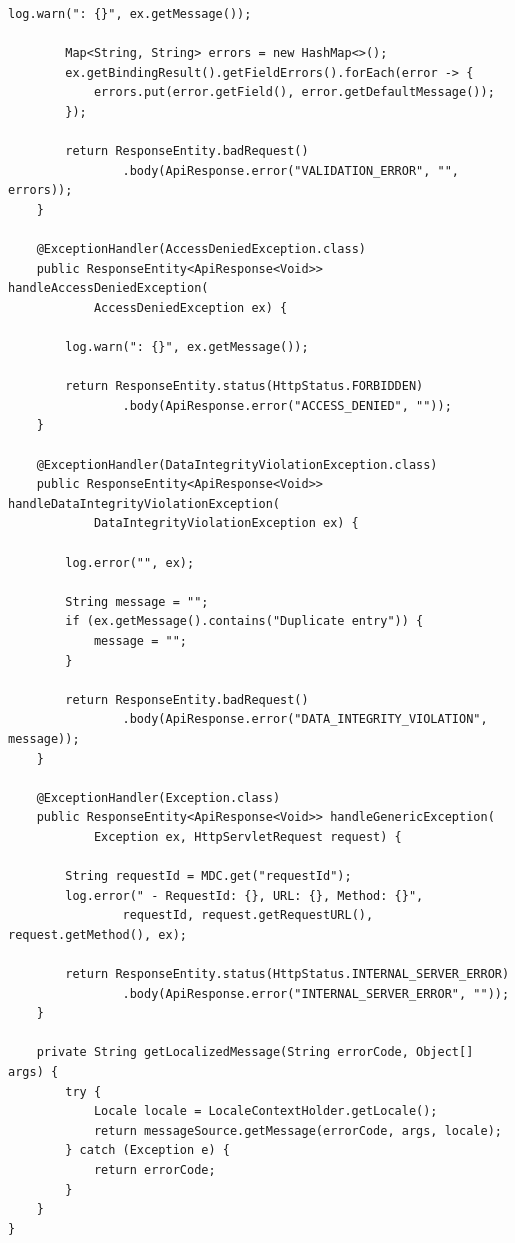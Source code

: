 \begin{lstlisting}[style=java]
        log.warn(": {}", ex.getMessage());
        
        Map<String, String> errors = new HashMap<>();
        ex.getBindingResult().getFieldErrors().forEach(error -> {
            errors.put(error.getField(), error.getDefaultMessage());
        });
        
        return ResponseEntity.badRequest()
                .body(ApiResponse.error("VALIDATION_ERROR", "", errors));
    }
    
    @ExceptionHandler(AccessDeniedException.class)
    public ResponseEntity<ApiResponse<Void>> handleAccessDeniedException(
            AccessDeniedException ex) {
        
        log.warn(": {}", ex.getMessage());
        
        return ResponseEntity.status(HttpStatus.FORBIDDEN)
                .body(ApiResponse.error("ACCESS_DENIED", ""));
    }
    
    @ExceptionHandler(DataIntegrityViolationException.class)
    public ResponseEntity<ApiResponse<Void>> handleDataIntegrityViolationException(
            DataIntegrityViolationException ex) {
        
        log.error("", ex);
        
        String message = "";
        if (ex.getMessage().contains("Duplicate entry")) {
            message = "";
        }
        
        return ResponseEntity.badRequest()
                .body(ApiResponse.error("DATA_INTEGRITY_VIOLATION", message));
    }
    
    @ExceptionHandler(Exception.class)
    public ResponseEntity<ApiResponse<Void>> handleGenericException(
            Exception ex, HttpServletRequest request) {
        
        String requestId = MDC.get("requestId");
        log.error(" - RequestId: {}, URL: {}, Method: {}", 
                requestId, request.getRequestURL(), request.getMethod(), ex);
        
        return ResponseEntity.status(HttpStatus.INTERNAL_SERVER_ERROR)
                .body(ApiResponse.error("INTERNAL_SERVER_ERROR", ""));
    }
    
    private String getLocalizedMessage(String errorCode, Object[] args) {
        try {
            Locale locale = LocaleContextHolder.getLocale();
            return messageSource.getMessage(errorCode, args, locale);
        } catch (Exception e) {
            return errorCode;
        }
    }
}


\end{lstlisting}
